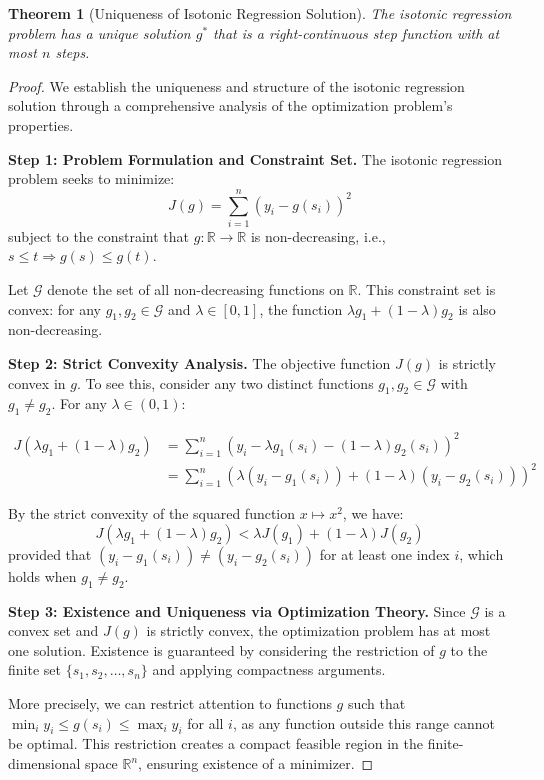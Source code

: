 \documentclass[12pt, a4paper]{article}
\newtheorem{theorem}{Theorem}
\begin{document}
\begin{theorem}[Uniqueness of Isotonic Regression Solution]
The isotonic regression problem has a unique solution $g^*$ that is a right-continuous step function with at most $n$ steps.
\end{theorem}

\begin{proof}
We establish the uniqueness and structure of the isotonic regression solution through a comprehensive analysis of the optimization problem's properties.

\textbf{Step 1: Problem Formulation and Constraint Set.}
The isotonic regression problem seeks to minimize:
$$J(g) = \sum_{i=1}^{n} (y_i - g(s_i))^2$$
subject to the constraint that $g: \mathbb{R} \rightarrow \mathbb{R}$ is non-decreasing, i.e., $s \leq t \Rightarrow g(s) \leq g(t)$.

Let $\mathcal{G}$ denote the set of all non-decreasing functions on $\mathbb{R}$. This constraint set is convex: for any $g_1, g_2 \in \mathcal{G}$ and $\lambda \in [0,1]$, the function $\lambda g_1 + (1-\lambda) g_2$ is also non-decreasing.

\textbf{Step 2: Strict Convexity Analysis.}
The objective function $J(g)$ is strictly convex in $g$. To see this, consider any two distinct functions $g_1, g_2 \in \mathcal{G}$ with $g_1 \neq g_2$. For any $\lambda \in (0,1)$:

\begin{align}
J(\lambda g_1 + (1-\lambda) g_2) &= \sum_{i=1}^{n} (y_i - \lambda g_1(s_i) - (1-\lambda) g_2(s_i))^2 \\
&= \sum_{i=1}^{n} (\lambda(y_i - g_1(s_i)) + (1-\lambda)(y_i - g_2(s_i)))^2
\end{align}

By the strict convexity of the squared function $x \mapsto x^2$, we have:
$$J(\lambda g_1 + (1-\lambda) g_2) < \lambda J(g_1) + (1-\lambda) J(g_2)$$
provided that $(y_i - g_1(s_i)) \neq (y_i - g_2(s_i))$ for at least one index $i$, which holds when $g_1 \neq g_2$.

\textbf{Step 3: Existence and Uniqueness via Optimization Theory.}
Since $\mathcal{G}$ is a convex set and $J(g)$ is strictly convex, the optimization problem has at most one solution. Existence is guaranteed by considering the restriction of $g$ to the finite set $\{s_1, s_2, \ldots, s_n\}$ and applying compactness arguments.

More precisely, we can restrict attention to functions $g$ such that $\min_i y_i \leq g(s_i) \leq \max_i y_i$ for all $i$, as any function outside this range cannot be optimal. This restriction creates a compact feasible region in the finite-dimensional space $\mathbb{R}^n$, ensuring existence of a minimizer.


\end{proof}
\end{document}
